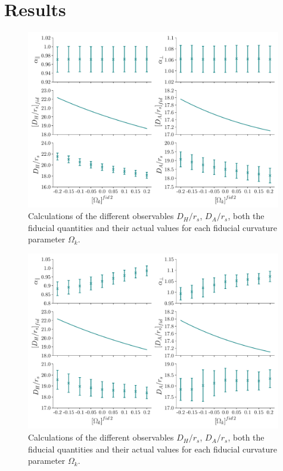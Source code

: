 \chapter{Results}

\begin{figure}[b]
	\centering
	\includegraphics[width=0.99\textwidth]{../figs/phase4_DA_DH_flat.pdf}
	\caption{Calculations of the different observables $D_H /r_s$, $D_A /r_s$, both the fiducial quantities and their actual values for each fiducial curvature parameter $\Omega_k$.}
	\label{fig:DA_DH}
\end{figure}

\begin{figure}[b]
	\centering
	\includegraphics[width=0.99\textwidth]{../figs/phase2_DA_DH_flat.pdf}
	\caption{Calculations of the different observables $D_H /r_s$, $D_A /r_s$, both the fiducial quantities and their actual values for each fiducial curvature parameter $\Omega_k$.}
	\label{fig:DA_DH}
\end{figure}

